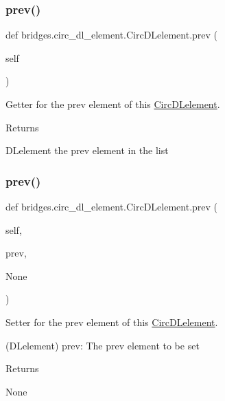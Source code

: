 \subsubsection{\texorpdfstring{prev()}{prev()}\hspace{0.1cm}{\footnotesize\ttfamily [1/2]}}
{\footnotesize\ttfamily def bridges.\+circ\+\_\+dl\+\_\+element.\+Circ\+D\+Lelement.\+prev (\begin{DoxyParamCaption}\item[{}]{self }\end{DoxyParamCaption})}



Getter for the prev element of this \mbox{\hyperlink{classbridges_1_1circ__dl__element_1_1_circ_d_lelement}{Circ\+D\+Lelement}}. 

\begin{DoxyReturn}{Returns}


D\+Lelement the prev element in the list 
\end{DoxyReturn}
\mbox{\label{classbridges_1_1circ__dl__element_1_1_circ_d_lelement_a5b62548af44a610a2230258fe641d8a2}} 
\subsubsection{\texorpdfstring{prev()}{prev()}\hspace{0.1cm}{\footnotesize\ttfamily [2/2]}}
{\footnotesize\ttfamily def bridges.\+circ\+\_\+dl\+\_\+element.\+Circ\+D\+Lelement.\+prev (\begin{DoxyParamCaption}\item[{}]{self,  }\item[{}]{prev,  }\item[{}]{None }\end{DoxyParamCaption})}



Setter for the prev element of this \mbox{\hyperlink{classbridges_1_1circ__dl__element_1_1_circ_d_lelement}{Circ\+D\+Lelement}}. 

(D\+Lelement) prev\+: The prev element to be set \begin{DoxyReturn}{Returns}


None 
\end{DoxyReturn}


